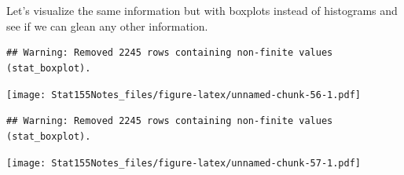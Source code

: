 \documentclass[]{book}
\newenvironment{Shaded}{\begin{snugshade}}{\end{snugshade}}
\newcommand{\DataTypeTok}[1]{\textcolor[rgb]{0.13,0.29,0.53}{#1}}
\newcommand{\KeywordTok}[1]{\textcolor[rgb]{0.13,0.29,0.53}{\textbf{#1}}}
\newcommand{\NormalTok}[1]{#1}
\newcommand{\OperatorTok}[1]{\textcolor[rgb]{0.81,0.36,0.00}{\textbf{#1}}}
\newcommand{\StringTok}[1]{\textcolor[rgb]{0.31,0.60,0.02}{#1}}
\begin{document}
Let's visualize the same information but with boxplots instead of histograms and see if we can glean any other information.

\begin{Shaded}
\end{Shaded}

\begin{verbatim}
## Warning: Removed 2245 rows containing non-finite values (stat_boxplot).
\end{verbatim}

\texttt{[image: Stat155Notes\_files/figure-latex/unnamed-chunk-56-1.pdf]}

\begin{Shaded}
\end{Shaded}

\begin{verbatim}
## Warning: Removed 2245 rows containing non-finite values (stat_boxplot).
\end{verbatim}

\texttt{[image: Stat155Notes\_files/figure-latex/unnamed-chunk-57-1.pdf]}
\end{document}
